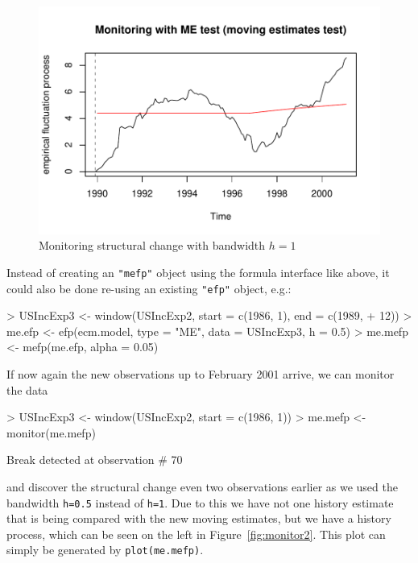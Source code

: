 \documentclass[10pt,a4paper]{article}
\begin{document}
\begin{figure}[htbp]
\begin{center}
\includegraphics{strucchange-intro-monitor-plot}
\caption{\label{fig:monitor} Monitoring structural change with bandwidth $h=1$}
\end{center}
\end{figure}

Instead of creating an {\tt "mefp"} object using the formula interface like
above, it could also be done re-using an existing \texttt{"efp"} object, e.g.:
\begin{Schunk}
\begin{Sinput}
> USIncExp3 <- window(USIncExp2, start = c(1986, 1), end = c(1989, 
+     12))
> me.efp <- efp(ecm.model, type = "ME", data = USIncExp3, h = 0.5)
> me.mefp <- mefp(me.efp, alpha = 0.05)
\end{Sinput}
\end{Schunk}
If now again the new observations up to February 2001 arrive, we can monitor
the data
\begin{Schunk}
\begin{Sinput}
> USIncExp3 <- window(USIncExp2, start = c(1986, 1))
> me.mefp <- monitor(me.mefp)
\end{Sinput}
\begin{Soutput}
Break detected at observation # 70 
\end{Soutput}
\end{Schunk}
and discover the structural change even two observations earlier as we used
the bandwidth {\tt h=0.5} instead of {\tt h=1}. Due to this we have not one
history estimate that is being compared with the new moving estimates, but we
have a history process, which can be seen on the left in
Figure~\ref{fig:monitor2}. This plot can simply be generated by
\texttt{plot(me.mefp)}.
\end{document}
